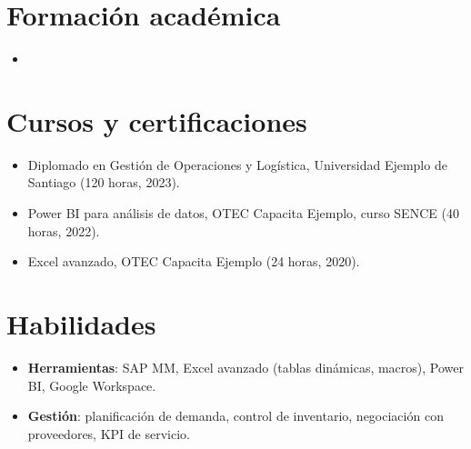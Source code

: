 \documentclass[11pt,a4paper,sans]{moderncv}
\begin{document}

\section{Formación académica}
\vspace{1pt}
\begin{itemize}
\item{}
\end{itemize}


\section{Cursos y certificaciones}
\vspace{1pt}
\begin{itemize}
\item {Diplomado en Gestión de Operaciones y Logística, Universidad Ejemplo de Santiago (120 horas, 2023).}
\item {Power BI para análisis de datos, OTEC Capacita Ejemplo, curso SENCE (40 horas, 2022).}
\item {Excel avanzado, OTEC Capacita Ejemplo (24 horas, 2020).}
\end{itemize}


\section{Habilidades}
\vspace{1pt}
\begin{itemize}
\item \textbf{Herramientas}: SAP MM, Excel avanzado (tablas dinámicas, macros), Power BI, Google Workspace.
\item \textbf{Gestión}: planificación de demanda, control de inventario, negociación con proveedores, KPI de servicio.
\end{itemize}
\end{document}
